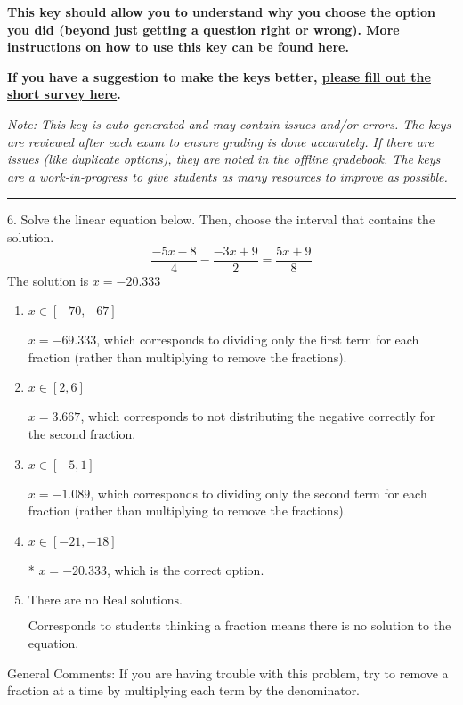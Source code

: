 \documentclass{article}[14pt]
\begin{document}
\textbf{This key should allow you to understand why you choose the option you did (beyond just getting a question right or wrong). \href{https://xronos.clas.ufl.edu/mac1105spring2020/courseDescriptionAndMisc/Exams/LearningFromResults}{More instructions on how to use this key can be found here}.}

\textbf{If you have a suggestion to make the keys better, \href{https://forms.gle/CZkbZmPbC9XALEE88}{please fill out the short survey here}.}

\textit{Note: This key is auto-generated and may contain issues and/or errors. The keys are reviewed after each exam to ensure grading is done accurately. If there are issues (like duplicate options), they are noted in the offline gradebook. The keys are a work-in-progress to give students as many resources to improve as possible.}

\rule{\textwidth}{0.4pt}

6. Solve the linear equation below. Then, choose the interval that contains the solution.
$$ \frac{-5 x - 8}{4} - \frac{-3 x + 9}{2} = \frac{5 x + 9}{8} $$ 
The solution is $ x = -20.333 $ 

\begin{enumerate}[label=\Alph*.] 
\item $ x \in [-70, -67] $ 

  $x = -69.333$, which corresponds to dividing only the first term for each fraction (rather than multiplying to remove the fractions). 
\item $ x \in [2, 6] $ 

  $x = 3.667$, which corresponds to not distributing the negative correctly for the second fraction. 
\item $ x \in [-5, 1] $ 

  $x = -1.089$, which corresponds to dividing only the second term for each fraction (rather than multiplying to remove the fractions). 
\item $ x \in [-21, -18] $ 

 * $x = -20.333$, which is the correct option. 
\item $ \text{There are no Real solutions.} $ 

 Corresponds to students thinking a fraction means there is no solution to the equation. 
\end{enumerate} 
 
General Comments: If you are having trouble with this problem, try to remove a fraction at a time by multiplying each term by the denominator.
\end{document}
